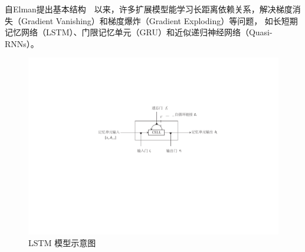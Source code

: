 自Elman提出基本结构~~以来，许多扩展模型能学习长距离依赖关系，解决梯度消失（Gradient Vanishing）和梯度爆炸（Gradient Exploding）等问题， 如长短期记忆网络（LSTM）、门限记忆单元（GRU）和近似递归神经网络（Quasi-RNNs）。

\begin{figure}[!t]
  \centering
  \includegraphics[width=.8\linewidth]{./figures/lstm.pdf}
  \caption{LSTM 模型示意图}\label{fig:lstm}
\end{figure}

